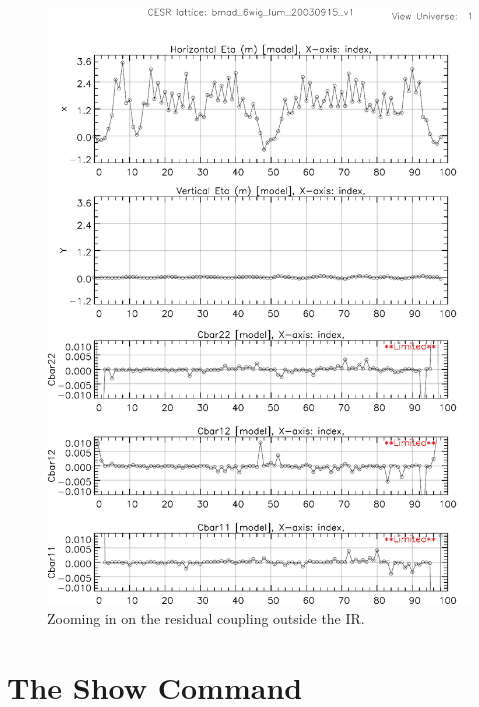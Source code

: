 \begin{figure}
  \centering
  \includegraphics[width=5in]{plot-coupling-no-IR.pdf}
  \caption{Zooming in on the residual coupling outside the IR.}
  \label{f:plot.coupling.no.IR}
\end{figure}

\section{The Show Command}

